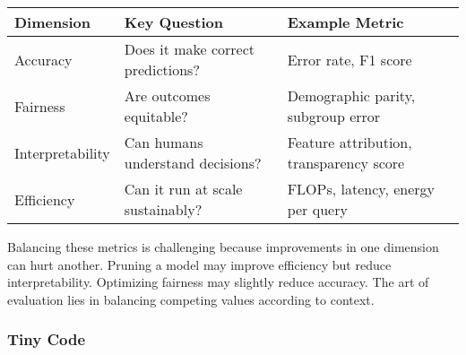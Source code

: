 \documentclass[
  letterpaper,
  DIV=11,
  numbers=noendperiod]{scrreprt}
\begin{document}
\begin{longtable}[]{@{}
  >{\raggedright\arraybackslash}p{}
  >{\raggedright\arraybackslash}p{}
  >{\raggedright\arraybackslash}p{}@{}}
\toprule\noalign{}
\begin{minipage}[b]{\linewidth}\raggedright
Dimension
\end{minipage} & \begin{minipage}[b]{\linewidth}\raggedright
Key Question
\end{minipage} & \begin{minipage}[b]{\linewidth}\raggedright
Example Metric
\end{minipage} \\
\midrule\noalign{}
\endhead
\bottomrule\noalign{}
\endlastfoot
Accuracy & Does it make correct predictions? & Error rate, F1 score \\
Fairness & Are outcomes equitable? & Demographic parity, subgroup
error \\
Interpretability & Can humans understand decisions? & Feature
attribution, transparency score \\
Efficiency & Can it run at scale sustainably? & FLOPs, latency, energy
per query \\
\end{longtable}

Balancing these metrics is challenging because improvements in one
dimension can hurt another. Pruning a model may improve efficiency but
reduce interpretability. Optimizing fairness may slightly reduce
accuracy. The art of evaluation lies in balancing competing values
according to context.

\subsubsection{Tiny Code}\label{tiny-code-88}
\end{document}
